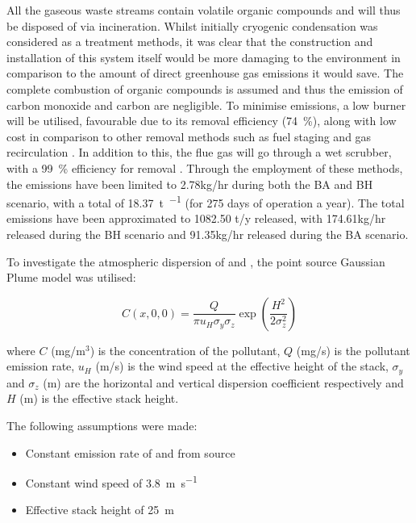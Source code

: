 All the gaseous waste 
streams contain volatile organic compounds and will thus be disposed of via incineration. Whilst initially cryogenic condensation was considered as a treatment methods, it was clear that the construction and installation of this system itself would be more damaging to the environment in comparison to the amount of direct greenhouse gas emissions it would save. The complete combustion of organic compounds is assumed and thus the emission of carbon monoxide and carbon are negligible. To minimise  emissions, a low  burner will be utilised, favourable due to its  removal efficiency (\SI{74}{\percent}), along with low cost in comparison to other  removal methods such as fuel staging and gas recirculation \cite{world_bank_group_pollution_1999}. In addition to this, the flue gas will go through a wet scrubber, with a \SI{99}{\percent} efficiency for  removal \cite{ceco_environmental_nox_nodate}. Through the employment of these methods, the  emissions have been limited to 2.78kg/hr during both the BA and BH scenario, with a total of \SI{18.37}{\tonne\per\year} (for 275 days of operation a year). The total  emissions have been approximated to 1082.50 t/y released, with 174.61kg/hr released during the BH scenario and 91.35kg/hr released during the BA scenario. 

To investigate the atmospheric dispersion of  and , the point source Gaussian Plume model was utilised:

\begin{equation}
C(x,0,0)= \frac{Q}{\pi u_{H} \sigma_{y} \sigma_{z}} \exp\left( \frac{H^2}{2\sigma_{z}^2}\right)
\end{equation}

\noindent where $C$ (mg/m$^3$) is the concentration of the pollutant, $Q$ (mg/s) is the pollutant emission rate, $u_H$ (m/s) is the wind speed at the effective height of the stack, $\sigma_{y}$ and $\sigma_{z}$ (m) are the horizontal and vertical dispersion coefficient respectively and $H$ (m) is the effective stack height. 

The following assumptions were made:

\begin{itemize}
\item Constant emission rate of  and  from source
\item Constant wind speed of \SI{3.8}{\m\per\s} \cite{weather_spark_average_nodate}
\item Effective stack height of \SI{25}{\m} 
\end{itemize}


